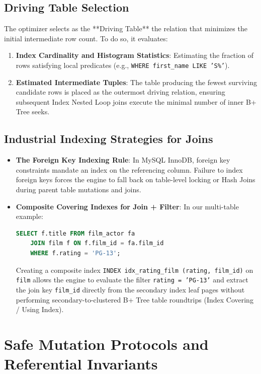 \documentclass[10pt,twocolumn,letterpaper]{article}
\begin{document}
\subsection{Driving Table Selection}
The optimizer selects as the **Driving Table** the relation that minimizes the initial intermediate row count. To do so, it evaluates:
\begin{enumerate}
    \item \textbf{Index Cardinality and Histogram Statistics}: Estimating the fraction of rows satisfying local predicates (e.g., \texttt{WHERE first\_name LIKE 'S\%'}).
    \item \textbf{Estimated Intermediate Tuples}: The table producing the fewest surviving candidate rows is placed as the outermost driving relation, ensuring subsequent Index Nested Loop joins execute the minimal number of inner B+ Tree seeks.
\end{enumerate}

\subsection{Industrial Indexing Strategies for Joins}
\begin{itemize}
    \item \textbf{The Foreign Key Indexing Rule}: In MySQL InnoDB, foreign key constraints mandate an index on the referencing column. Failure to index foreign keys forces the engine to fall back on table-level locking or Hash Joins during parent table mutations and joins.
    \item \textbf{Composite Covering Indexes for Join + Filter}: In our multi-table example:
    \begin{lstlisting}[language=SQL]
    SELECT f.title FROM film_actor fa 
    JOIN film f ON f.film_id = fa.film_id 
    WHERE f.rating = 'PG-13';
    \end{lstlisting}
    Creating a composite index \texttt{INDEX idx\_rating\_film (rating, film\_id)} on \texttt{film} allows the engine to evaluate the filter \texttt{rating = 'PG-13'} and extract the join key \texttt{film\_id} directly from the secondary index leaf pages without performing secondary-to-clustered B+ Tree table roundtrips (Index Covering / Using Index).
\end{itemize}

\section{Safe Mutation Protocols and Referential Invariants}
\label{sec:safe_mutations}
\end{document}
